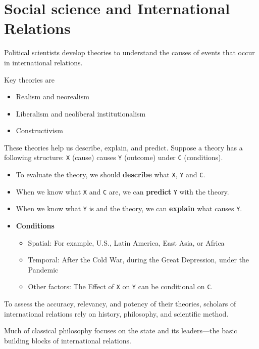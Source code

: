 \documentclass[
]{book}
\begin{document}
\hypertarget{social-science-and-international-relations}{%
\section{Social science and International Relations}\label{social-science-and-international-relations}}

Political scientists develop theories to understand the causes of events that occur in international relations.

Key theories are

\begin{itemize}
\item
  Realism and neorealism
\item
  Liberalism and neoliberal institutionalism
\item
  Constructivism
\end{itemize}

These theories help us describe, explain, and predict. Suppose a theory has a following structure: \texttt{X} (cause) causes \texttt{Y} (outcome) under \texttt{C} (conditions).

\begin{itemize}
\item
  To evaluate the theory, we should \textbf{describe} what \texttt{X}, \texttt{Y} and \texttt{C}.
\item
  When we know what \texttt{X} and \texttt{C} are, we can \textbf{predict} \texttt{Y} with the theory.
\item
  When we know what \texttt{Y} is and the theory, we can \textbf{explain} what causes \texttt{Y}.
\item
  \textbf{Conditions}

  \begin{itemize}
  \item
    Spatial: For example, U.S., Latin America, East Asia, or Africa
  \item
    Temporal: After the Cold War, during the Great Depression, under the Pandemic
  \item
    Other factors: The Effect of \texttt{X} on \texttt{Y} can be conditional on \texttt{C}.
  \end{itemize}
\end{itemize}

To assess the accuracy, relevancy, and potency of their theories, scholars of international relations rely on history, philosophy, and scientific method.

Much of classical philosophy focuses on the state and its leaders---the basic building blocks of international relations.
\end{document}
